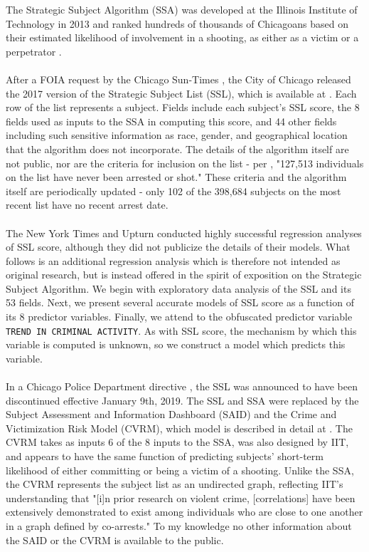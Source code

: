 The Strategic Subject Algorithm (SSA) was developed at the Illinois Institute of Technology in 2013 and ranked hundreds of thousands of Chicagoans based on their estimated likelihood of involvement in a shooting, as either as a victim or a perpetrator \cite{nyt}.\\\\
After a FOIA request by the Chicago Sun-Times \cite{upturn}, the City of Chicago released the 2017 version of the Strategic Subject List (SSL), which is available at \cite{data}. Each row of the list represents a subject. Fields include each subject's SSL score, the 8 fields used as inputs to the SSA in computing this score, and 44 other fields including such sensitive information as race, gender, and geographical location that the algorithm does not incorporate. The details of the algorithm itself are not public, nor are the criteria for inclusion on the list - per \cite{upturn}, "127,513 individuals on the list have never been arrested or shot." These criteria and the algorithm itself are periodically updated - only 102 of the 398,684 subjects on the most recent list have no recent arrest date.\\\\
The New York Times \cite{nyt} and Upturn \cite{upturn} conducted highly successful regression analyses of SSL score, although they did not publicize the details of their models. What follows is an additional regression analysis which is therefore not intended as original research, but is instead offered in the spirit of exposition on the Strategic Subject Algorithm. We begin with exploratory data analysis of the SSL and its 53 fields. Next, we present several accurate models of SSL score as a function of its 8 predictor variables. Finally, we attend to the obfuscated predictor variable {\tt TREND IN CRIMINAL ACTIVITY}. As with SSL score, the mechanism by which this variable is computed is unknown, so we construct a model which predicts this variable.\\\\
In a Chicago Police Department directive \cite{directive}, the SSL was announced to have been discontinued effective January 9th, 2019. The SSL and SSA were replaced by the Subject Assessment and Information Dashboard (SAID)
 and the Crime and Victimization Risk Model (CVRM), which model is described in detail at \cite{factsheet}. The CVRM takes as inputs 6 of the 8 inputs to the SSA, was also designed by IIT, and appears to have the same function of predicting subjects' short-term likelihood of either committing or being a victim of a shooting. Unlike the SSA, the CVRM represents the subject list as an undirected graph, reflecting IIT's understanding that "[i]n prior research on violent crime, [correlations] have been extensively demonstrated to exist among individuals who are close to one another in a graph defined by co-arrests." To my knowledge no other information about the SAID or the CVRM is available to the public.

